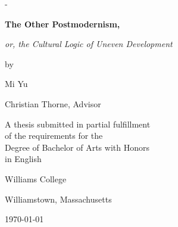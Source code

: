 \cleardoublepage{}

\thispagestyle{empty}

\calccentering\unitlength

\begin{adjustwidth}{\unitlength}{-\unitlength}
    \begin{center}
        \huge
        \textbf{The Other Postmodernism,}

        \vspace{0.5\baselineskip}

        \LARGE
        \textit{or, the Cultural Logic of Uneven Development}

        \large

        \vspace{3\baselineskip}

        by

        \vspace{0.5\baselineskip}

        Mi Yu

        \vspace{3\baselineskip}

        Christian Thorne, Advisor

        \vspace{3\baselineskip}

        A thesis submitted in partial fulfillment\\
        of the requirements for the\\
        Degree of Bachelor of Arts with Honors\\
        in English

        \vspace{3\baselineskip}

        Williams College

        Williamstown, Massachusetts

        \vspace{3\baselineskip}

        \today
    \end{center}
\end{adjustwidth}

